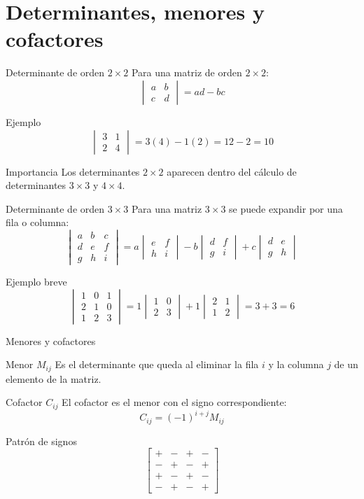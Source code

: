 \documentclass[aspectratio=169]{beamer}
\newcommand{\mat}[1]{\begin{bmatrix}#1\end{bmatrix}}
\newcommand{\detm}[1]{\begin{vmatrix}#1\end{vmatrix}}
\begin{document}
\section{Determinantes, menores y cofactores}

\begin{frame}{Determinante de orden $2\times2$}
Para una matriz de orden $2\times2$:
\[
\detm{a&b\\c&d}=ad-bc
\]

\begin{exampleblock}{Ejemplo}
\[
\detm{3&1\\2&4}=3(4)-1(2)=12-2=10
\]
\end{exampleblock}

\begin{block}{Importancia}
Los determinantes $2\times2$ aparecen dentro del cálculo de determinantes $3\times3$ y $4\times4$.
\end{block}
\end{frame}

\begin{frame}{Determinante de orden $3\times3$}
Para una matriz $3\times3$ se puede expandir por una fila o columna:
\[
\detm{a&b&c\\d&e&f\\g&h&i}
=a\detm{e&f\\h&i}-b\detm{d&f\\g&i}+c\detm{d&e\\g&h}
\]

\begin{exampleblock}{Ejemplo breve}
\[
\detm{1&0&1\\2&1&0\\1&2&3}
=1\detm{1&0\\2&3}+1\detm{2&1\\1&2}=3+3=6
\]
\end{exampleblock}
\end{frame}

\begin{frame}{Menores y cofactores}
\begin{block}{Menor $M_{ij}$}
Es el determinante que queda al eliminar la fila $i$ y la columna $j$ de un elemento de la matriz.
\end{block}

\begin{block}{Cofactor $C_{ij}$}
El cofactor es el menor con el signo correspondiente:
\[
C_{ij}=(-1)^{i+j}M_{ij}
\]
\end{block}

\begin{exampleblock}{Patrón de signos}
\[
\mat{+&-&+&-\\-&+&-&+\\+&-&+&-\\-&+&-&+}
\]
\end{exampleblock}
\end{frame}
\end{document}
